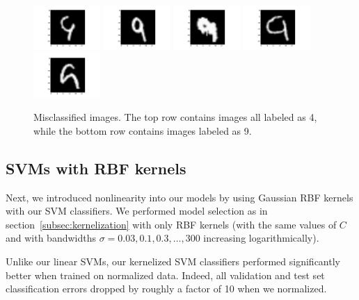 \documentclass{article}
\begin{document}
\begin{multicols}{2}
\begin{figure}[t]
   \includegraphics[width=1in]{img/4-1-wrong/4-1-wrong-158.pdf} \hspace{-.25in}
   \includegraphics[width=1in]{img/4-1-wrong/4-1-wrong-224.pdf} \hspace{-.25in}
   \includegraphics[width=1in]{img/4-1-wrong/4-1-wrong-247.pdf} \hspace{-.25in}
   \includegraphics[width=1in]{img/4-1-wrong/4-1-wrong-259.pdf} \hspace{-.25in}
   \includegraphics[width=1in]{img/4-1-wrong/4-1-wrong-281.pdf} \hspace{-.25in}
   \caption{Misclassified images. The top row contains images all labeled as 4, 
   while the bottom row contains images labeled as 9.}
   \label{fig:4-1-wrong}
\end{figure}

\subsection{SVMs with RBF kernels}

Next, we introduced nonlinearity into our models
by using Gaussian RBF kernels with our SVM classifiers.
We performed model selection as in section~\ref{subsec:kernelization}
with only RBF kernels
(with the same values of $C$
and with bandwidths $\sigma = 0.03,0.1,0.3,\dots,300$ increasing logarithmically).

Unlike our linear SVMs,
our kernelized SVM classifiers performed significantly better
when trained on normalized data.
Indeed, all validation and test set classification errors
dropped by roughly a factor of 10
when we normalized.


\end{multicols}
\end{document}
